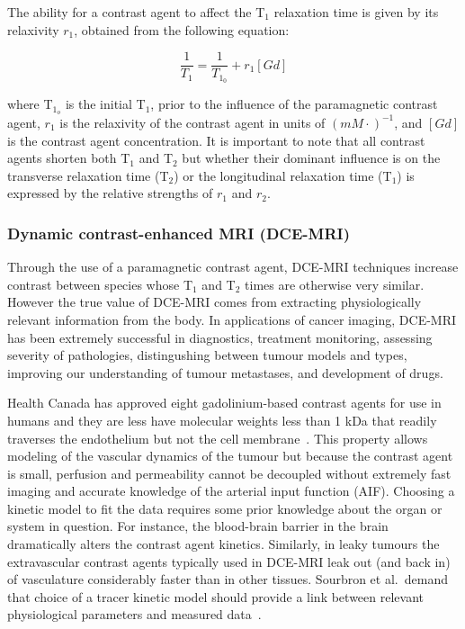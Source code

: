 The ability for a contrast agent to affect the T$_1$ relaxation time is given by its relaxivity $r_1$, obtained from the following equation:

\begin{equation}
\frac{1}{T_{1}} = \frac{1}{T_{1_0}} + r_1 [Gd]
\end{equation}

where T$_{1_o}$ is the initial T$_1$, prior to the influence of the paramagnetic contrast agent, $r_1$ is the relaxivity of the contrast agent in units of $(mM\cdot)^{-1}$, and $[Gd]$ is the contrast agent concentration.
It is important to note that all contrast agents shorten both T$_1$ and T$_2$ but whether their dominant influence is on the transverse relaxation time (T$_2$) or the longitudinal relaxation time (T$_1$) is expressed by the relative strengths of $r_1$ and $r_2$.

\subsubsection{Dynamic contrast-enhanced MRI (\acs{DCE-MRI})}

Through the use of a paramagnetic contrast agent, \acs{DCE-MRI} techniques increase contrast between species whose T$_1$ and T$_2$ times are otherwise very similar.
However the true value of \acs{DCE-MRI} comes from extracting physiologically relevant information from the body. 
In applications of cancer imaging, \acs{DCE-MRI} has been extremely successful in diagnostics, treatment monitoring, assessing severity of pathologies, distingushing between tumour models and types, improving our understanding of tumour metastases, and development of drugs.

Health Canada has approved eight gadolinium-based contrast agents for use in humans and they are less have molecular weights less than 1 \acs{kDa} that readily traverses the endothelium but not the cell membrane~\cite{WalkerSamuel:2006ch}. 
This property allows modeling of the vascular dynamics of the tumour but because the contrast agent is small, perfusion and permeability cannot be decoupled without extremely fast imaging and accurate knowledge of the arterial input function (\acs{AIF})\cite{Sourbron:2011ce}.
Choosing a kinetic model to fit the data requires some prior knowledge about the organ or system in question. 
For instance, the blood-brain barrier in the brain dramatically alters the contrast agent kinetics. 
Similarly, in leaky tumours the extravascular contrast agents typically used in \acs{DCE-MRI} leak out (and back in) of vasculature considerably faster than in other tissues. 
Sourbron et al.\ demand that choice of a tracer kinetic model should provide a link between relevant physiological parameters and measured data~\cite{Sourbron:2011ce}. 

